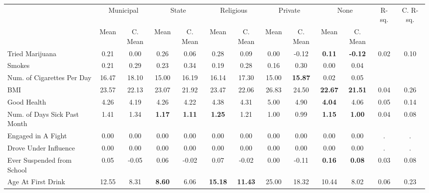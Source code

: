 \begin{tabular}{l c c c c c c c c c c c c}
\toprule
& \multicolumn{2}{c}{Municipal} & \multicolumn{2}{c}{State} & \multicolumn{2}{c}{Religious} & \multicolumn{2}{c}{Private} & \multicolumn{2}{c}{None} & R-sq. & C. R-sq. \\
& \scriptsize Mean & \scriptsize C. Mean & \scriptsize Mean & \scriptsize C. Mean & \scriptsize Mean & \scriptsize C. Mean & \scriptsize Mean & \scriptsize C. Mean & \scriptsize Mean & \scriptsize C. Mean & & \\
\midrule
Tried Marijuana &      0.21 & 0.00 &      0.26 & 0.06 &      0.28 & 0.09 &      0.00 & -0.12 & \textbf{     0.11} & \textbf{    -0.12} &      0.02 &      0.10 \\
Smokes &      0.21 & 0.29 &      0.23 & 0.34 &      0.19 & 0.28 &      0.16 & 0.30 &      0.00 &      0.04 \\
Num. of Cigarettes Per Day &     16.47 & 18.10 &     15.00 & 16.19 &     16.14 & 17.30 &     15.00 & \textbf{    15.87} &      0.02 &      0.05 \\
BMI &     23.57 & 22.13 &     23.07 & 21.92 &     23.47 & 22.06 &     26.83 & 24.50 & \textbf{    22.67} & \textbf{    21.51} &      0.04 &      0.26 \\
Good Health &      4.26 & 4.19 &      4.26 & 4.22 &      4.38 & 4.31 &      5.00 & 4.90 & \textbf{     4.04} & 4.06 &      0.05 &      0.14 \\
Num. of Days Sick Past Month &      1.41 & 1.34 & \textbf{     1.17} & \textbf{     1.11} & \textbf{     1.25} & 1.21 &      1.00 & 0.99 & \textbf{     1.15} & \textbf{     1.00} &      0.04 &      0.08 \\
Engaged in A Fight &      0.00 & 0.00 &      0.00 & 0.00 &      0.00 & 0.00 &      0.00 & 0.00 &      0.00 & 0.00 &         . &         . \\
Drove Under Influence &      0.00 & 0.00 &      0.00 & 0.00 &      0.00 & 0.00 &      0.00 & 0.00 &      0.00 & 0.00 &         . &         . \\
Ever Suspended from School &      0.05 & -0.05 &      0.06 & -0.02 &      0.07 & -0.02 &      0.00 & -0.11 & \textbf{     0.16} & \textbf{     0.08} &      0.03 &      0.08 \\
Age At First Drink &     12.55 & 8.31 & \textbf{     8.60} & 6.06 & \textbf{    15.18} & \textbf{    11.43} &     25.00 & 18.32 &     10.44 & 8.02 &      0.06 &      0.23 \\
\bottomrule
\end{tabular}
